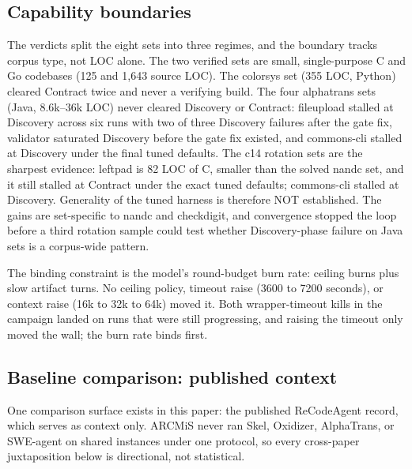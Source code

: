 \documentclass[11pt]{article}
\begin{document}
\subsection{Capability boundaries}

The verdicts split the eight sets into three regimes, and the boundary
tracks corpus type, not LOC alone. The two verified sets are small,
single-purpose C and Go codebases (125 and 1{,}643 source LOC). The
colorsys set (355 LOC, Python) cleared Contract twice and never a
verifying build. The four alphatrans sets (Java, 8.6k--36k LOC) never
cleared Discovery or Contract: fileupload stalled at Discovery across six
runs with two of three Discovery failures after the gate fix, validator
saturated Discovery before the gate fix existed, and commons-cli stalled
at Discovery under the final tuned defaults. The c14 rotation sets are
the sharpest evidence: leftpad is 82 LOC of C, smaller than the solved
nandc set, and it still stalled at Contract under the exact tuned
defaults; commons-cli stalled at Discovery. Generality of the tuned
harness is therefore NOT established. The gains are set-specific to
nandc and checkdigit, and convergence stopped the loop before a third
rotation sample could test whether Discovery-phase failure on Java sets
is a corpus-wide pattern.

The binding constraint is the model's round-budget burn rate: ceiling
burns plus slow artifact turns. No ceiling policy, timeout raise (3600
to 7200 seconds), or context raise (16k to 32k to 64k) moved it. Both
wrapper-timeout kills in the campaign landed on runs that were still
progressing, and raising the timeout only moved the wall; the burn rate
binds first.

\subsection{Baseline comparison: published context}
\label{sec:baseline}

One comparison surface exists in this paper: the published ReCodeAgent
record, which serves as context only. ARCMiS never ran Skel, Oxidizer,
AlphaTrans, or SWE-agent on shared instances under one protocol, so
every cross-paper juxtaposition below is directional, not statistical.
\end{document}
